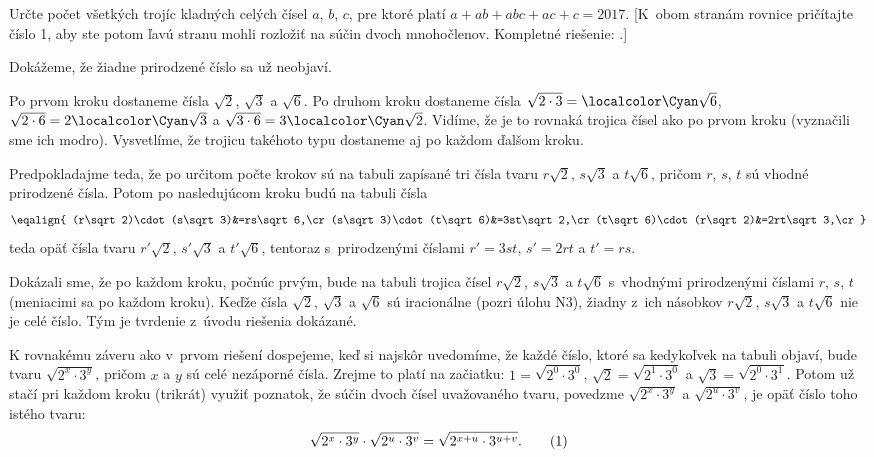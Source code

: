 {Určte počet všetkých trojíc kladných celých čísel $a$, $b$, $c$, pre ktoré platí
$a+ab+abc+ac+c=2017$.
[K~obom stranám rovnice pričítajte číslo 1, aby ste potom ľavú
stranu mohli rozložiť na súčin dvoch mnohočlenov.
Kompletné riešenie: .]

}

{%
Dokážeme, že žiadne prirodzené číslo sa už neobjaví.

Po prvom kroku dostaneme čísla
$\sqrt{2}$, $\sqrt{3}$ a $\sqrt{6}$.
Po druhom kroku dostaneme čísla
$\sqrt{2\cdot3}={\localcolor\Cyan\sqrt{6}}$,
$\sqrt{2\cdot6}=2{\localcolor\Cyan\sqrt{3}}$ a
$\sqrt{3\cdot6}=3{\localcolor\Cyan\sqrt{2}}$.
Vidíme, že je to  rovnaká
trojica čísel ako po prvom kroku (vyznačili sme ich modro).
Vysvetlíme, že trojicu takéhoto typu dostaneme aj po každom
ďalšom kroku.

Predpokladajme teda, že po určitom počte krokov sú na tabuli
zapísané tri čísla tvaru $r\sqrt2$, $s\sqrt3$ a $t\sqrt6$,
pričom $r$, $s$, $t$ sú vhodné prirodzené čísla. Potom po
nasledujúcom kroku budú na tabuli čísla
$$\eqalign{
(r\sqrt2)\cdot(s\sqrt3)&=rs\sqrt6,\cr
(s\sqrt3)\cdot(t\sqrt6)&=3st\sqrt2,\cr
(t\sqrt6)\cdot(r\sqrt2)&=2rt\sqrt3,\cr
}$$
teda opäť čísla tvaru $r'\sqrt2$, $s'\sqrt3$ a $t'\sqrt6$, tentoraz
s~prirodzenými číslami $r'=3st$, $s'=2rt$ a $t'=rs$.

Dokázali sme, že po každom kroku, počnúc prvým, bude na tabuli
trojica čísel $r\sqrt2$, $s\sqrt3$ a $t\sqrt6$ s~vhodnými
prirodzenými číslami $r$, $s$, $t$ (meniacimi sa po každom kroku).
Keďže čísla $\sqrt2$, $\sqrt3$ a $\sqrt6$
sú iracionálne (pozri úlohu N3), žiadny z~ich násobkov
$r\sqrt2$, $s\sqrt3$ a $t\sqrt6$ nie je celé číslo.
Tým je tvrdenie z~úvodu riešenia dokázané.


\ineriesenie
K rovnakému záveru ako v~prvom riešení dospejeme, keď si najskôr
uvedomíme, že každé číslo, ktoré sa kedykoľvek na tabuli objaví, bude tvaru
$\sqrt{2^x\cdot3^y}$, pričom $x$ a $y$ sú celé nezáporné čísla.
Zrejme to platí na začiatku: $1=\sqrt{2^0\cdot3^0}$,
$\sqrt2=\sqrt{2^1\cdot3^0}$ a $\sqrt3=\sqrt{2^0\cdot3^1}$.
Potom už stačí pri každom kroku (trikrát) využiť poznatok, že
súčin dvoch čísel uvažovaného tvaru, povedzme $\sqrt{2^x\cdot3^y}$
a $\sqrt{2^u\cdot3^v}$, je opäť číslo toho istého tvaru:
$$
\sqrt{2^x\cdot3^y}\cdot\sqrt{2^u\cdot3^v}=
\sqrt{2^{x+u}\cdot3^{u+v}}.
\tag1
$$

}
